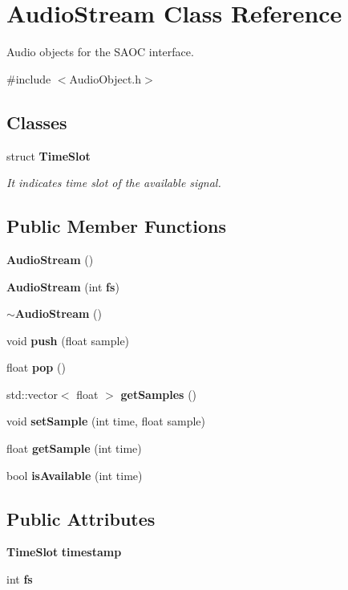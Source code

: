 \section{Audio\+Stream Class Reference}
\label{class_audio_stream}


Audio objects for the S\+A\+OC interface.  




{\ttfamily \#include $<$Audio\+Object.\+h$>$}

\subsection*{Classes}
\begin{DoxyCompactItemize}
\item 
struct \textbf{ Time\+Slot}
\begin{DoxyCompactList}\small\item\em It indicates time slot of the available signal. \end{DoxyCompactList}\end{DoxyCompactItemize}
\subsection*{Public Member Functions}
\begin{DoxyCompactItemize}
\item 
\textbf{ Audio\+Stream} ()
\item 
\textbf{ Audio\+Stream} (int \textbf{ fs})
\item 
\textbf{ $\sim$\+Audio\+Stream} ()
\item 
void \textbf{ push} (float sample)
\item 
float \textbf{ pop} ()
\item 
std\+::vector$<$ float $>$ \textbf{ get\+Samples} ()
\item 
void \textbf{ set\+Sample} (int time, float sample)
\item 
float \textbf{ get\+Sample} (int time)
\item 
bool \textbf{ is\+Available} (int time)
\end{DoxyCompactItemize}
\subsection*{Public Attributes}
\begin{DoxyCompactItemize}
\item 
\textbf{ Time\+Slot} \textbf{ timestamp}
\item 
int \textbf{ fs}
\end{DoxyCompactItemize}
